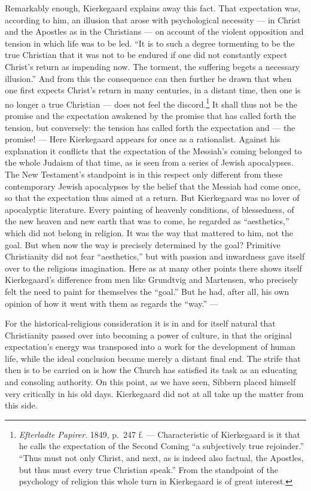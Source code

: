 \documentclass[12pt,a4paper]{book}
\newcommand{\opage}[1]{\marginnote{\footnotesize\textit{[#1]}}}
\begin{document}
Remarkably enough, Kierkegaard explains away this fact. That expectation was, according to him, an
illusion that arose with psychological necessity --- in Christ and the Apostles as in the
Christians --- on account of the violent opposition and tension in which life was to be led. ``It is
to such a degree tormenting to be the true Christian that it was not to be endured if one did not
constantly expect Christ's return as impending now. The torment, the suffering begets a necessary
illusion.'' And from this the consequence can then further be drawn that when one first expects
Christ's return in many centuries, in a distant time, then one is no longer a true Christian --- does
not feel the discord.\footnote{\emph{Efterladte Papirer}. 1849, p.~247 f. --- Characteristic of
Kierkegaard is it that he calls the expectation of the Second Coming ``a subjectively true
rejoinder.'' ``Thus must not only Christ, and next, as is indeed also factual, the Apostles, but
thus must every true Christian speak.'' From the standpoint of the psychology of religion this whole
turn in Kierkegaard is of great interest.} It shall thus \opage{173}not be the promise and the expectation
awakened by the promise that has called forth the tension, but conversely: the tension has called
forth the expectation and --- the promise! --- Here Kierkegaard appears for once as a rationalist.
Against his explanation it conflicts that the expectation of the Messiah's coming belonged to the
whole Judaism of that time, as is seen from a series of Jewish apocalypses. The New Testament's
standpoint is in this respect only different from these contemporary Jewish apocalypses by the
belief that the Messiah had come once, so that the expectation thus aimed at a return. But
Kierkegaard was no lover of apocalyptic literature. Every painting of heavenly conditions, of
blessedness, of the new heaven and new earth that was to come, he regarded as ``aesthetics,'' which
did not belong in religion. It was the way that mattered to him, not the goal. But when now the way
is precisely determined by the goal? Primitive Christianity did not fear ``aesthetics,'' but with
passion and inwardness gave itself over to the religious imagination. Here as at many other points
there shows itself Kierkegaard's difference from men like Grundtvig and Martensen, who precisely
felt the need to paint for themselves the ``goal.'' But he had, after all, his own opinion of how it
went with them as regards the ``way.'' ---

For the historical-religious consideration it is in and for itself natural that Christianity passed
over into becoming a power of culture, in that the original expectation's energy was transposed into
a work for the development of human life, while the ideal conclusion became merely a distant final
end. The strife that then is to be carried on is how the Church has satisfied its task as an
educating and consoling authority. On this point, as we have seen, Sibbern placed himself very
critically in his old days. Kierkegaard did not at all take up the matter from this side.
\end{document}
